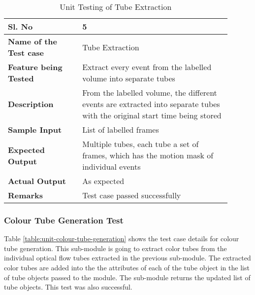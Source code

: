         \FloatBarrier
        \begin{table}[H]
            \begin{tabular}{|p{0.3\linewidth}|p{0.6\linewidth}|}
                \hline
                \textbf{Sl. No }              &\textbf{ 5}\\
                \hline
                \textbf{Name of the Test case}  & Tube Extraction \\
                \hline
                \textbf{Feature being Tested}  & Extract every event from the labelled volume into separate tubes \\
                \hline
                \textbf{Description}           & From the labelled volume, the different events are extracted into separate tubes with the original start time being stored \\
                \hline
                \textbf{Sample Input}          & List of labelled frames \\
                \hline
                \textbf{Expected Output}       & Multiple tubes, each tube a set of frames, which has the motion mask of individual events \\
                \hline
                \textbf{Actual Output}         & As expected \\
                \hline
                \textbf{Remarks }              & Test case passed successfully \\
                \hline
            \end{tabular}
            \caption{Unit Testing of Tube Extraction}
            \label{table:unit-tube-extraction}
        \end{table}


        \subsubsection{Colour Tube Generation Test}

        Table \ref{table:unit-colour-tube-generation} shows the test case details for colour tube generation. This sub-module is going to extract color tubes from the individual optical flow tubes extracted in the previous sub-module. The extracted color tubes are added into the the attributes of each of the tube object in the list of tube objects passed to the module. The sub-module returns the updated list of tube objects. This test was also successful.

